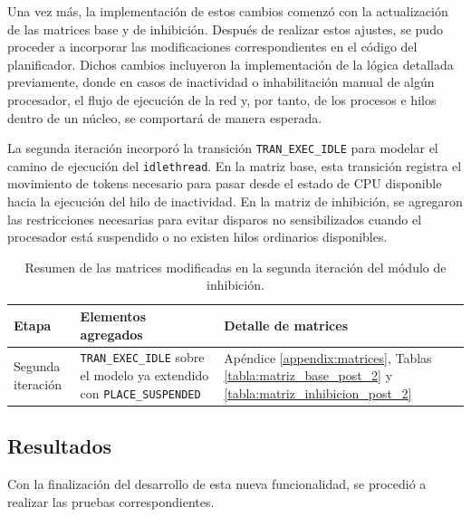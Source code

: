 Una vez más, la implementación de estos cambios comenzó con la actualización de las matrices base y de inhibición. Después de realizar estos ajustes, se pudo proceder a incorporar las modificaciones correspondientes en el código del planificador. Dichos cambios incluyeron la implementación de la lógica detallada previamente, donde en casos de inactividad o inhabilitación manual de algún procesador, el flujo de ejecución de la red y, por tanto, de los procesos e hilos dentro de un núcleo, se comportará de manera esperada.\par

La segunda iteración incorporó la transición \verb|TRAN_EXEC_IDLE| para modelar el camino de ejecución del \texttt{idlethread}. En la matriz base, esta transición registra el movimiento de tokens necesario para pasar desde el estado de CPU disponible hacia la ejecución del hilo de inactividad. En la matriz de inhibición, se agregaron las restricciones necesarias para evitar disparos no sensibilizados cuando el procesador está suspendido o no existen hilos ordinarios disponibles.\par

\begin{table}[H]
    \centering
    \begin{tabular}{|>{\RaggedRight\arraybackslash}p{}|>{\RaggedRight\arraybackslash}p{}|>{\RaggedRight\arraybackslash}p{}|}
        \hline
        \textbf{Etapa} & \textbf{Elementos agregados} & \textbf{Detalle de matrices} \\
        \hline
        Segunda iteración & \verb|TRAN_EXEC_IDLE| sobre el modelo ya extendido con \verb|PLACE_SUSPENDED| & Apéndice \ref{appendix:matrices}, Tablas \ref{tabla:matriz_base_post_2} y \ref{tabla:matriz_inhibicion_post_2} \\
        \hline
    \end{tabular}
    \caption{Resumen de las matrices modificadas en la segunda iteración del módulo de inhibición.}
    \label{tabla:resumen_matrices_segunda_iteracion}
\end{table}

\subsection{Resultados}

Con la finalización del desarrollo de esta nueva funcionalidad, se procedió a realizar las pruebas correspondientes.\par

